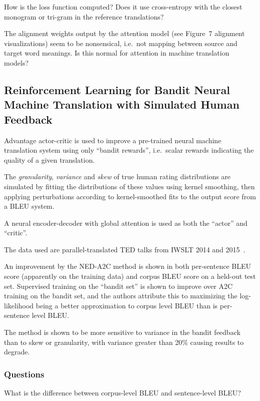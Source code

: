 \documentclass[a4paper, 12pt]{article}
\begin{document}
How is the loss function computed? Does it use cross-entropy with the closest
monogram or tri-gram in the reference translations?

The alignment weights output by the attention model (see Figure~7 alignment
visualizations) seem to be nonsensical, i.e.\ not mapping between source and
target word meanings. Is this normal for attention in machine translation
models?


\subsection{Reinforcement Learning for Bandit Neural Machine Translation with
            Simulated Human Feedback~\citet{DBLP:journals/corr/NguyenDB17}}

Advantage actor-critic is used to improve a pre-trained neural machine
translation system using only ``bandit rewards'', i.e.\ scalar rewards
indicating the quality of a given translation.

The \emph{granularity}, \emph{variance} and \emph{skew} of true human rating
distributions are simulated by fitting the distributions of these values using
kernel smoothing, then applying perturbations according to kernel-smoothed fits
to the output score from a BLEU system.

A neural encoder-decoder with global attention is used as both the ``actor''
and ``critic''.

The data used are parallel-translated TED talks from IWSLT 2014 and
2015~\citet{cettolo2015iwslt}.

An improvement by the NED-A2C method is shown in both per-sentence BLEU score
(apparently on the training data) and corpus BLEU score on a held-out test set.
Supervised training on the ``bandit set'' is shown to improve over A2C training
on the bandit set, and the authors attribute this to maximizing the
log-likelihood being a better approximation to corpus level BLEU than is
per-sentence level BLEU\@.

The method is shown to be more sensitive to variance in the bandit feedback
than to skew or granularity, with variance greater than 20\% causing results to
degrade.


\subsubsection{Questions}

What is the difference between corpus-level BLEU and sentence-level BLEU\@?
\end{document}
